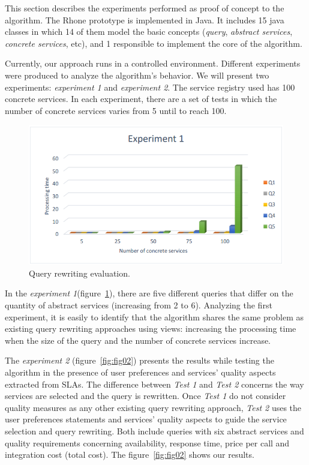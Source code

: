 This section describes the experiments performed as proof of concept to the algorithm.
The Rhone prototype is implemented in Java.
It includes 15 java classes in which 14 of them model the basic concepts 
(\textit{query}, \textit{abstract services}, \textit{concrete services}, etc), 
and 1 responsible to implement the core of the algorithm. 

Currently, our approach runs in a controlled environment. 
Different experiments were produced to analyze the algorithm's behavior.
We will present two experiments: \textit{experiment 1} and \textit{experiment 2}.
The service registry used has 100 concrete services. 
In each experiment, there are a set of tests in which the number of concrete 
services varies from 5 until to reach 100.

\begin{figure}[!h]
\centering
\includegraphics[scale=0.4]{exp1.png}
\caption{Query rewriting evaluation.}\label{fig01}
\end{figure} 

In the \textit{experiment 1}(figure~\ref{fig01}), there are five different queries that differ on
the quantity of abstract services (increasing from 2 to 6). Analyzing the first
experiment, it is easily to identify that the algorithm shares the same problem
as existing query rewriting approaches using views: increasing the
processing time when the size of the query and the number of concrete services increase.


The \textit{experiment 2} (figure~\ref{fig:fig02}) presents the results while testing the algorithm in the presence of user preferences and services' quality aspects extracted from SLAs.  The difference between \textit{Test 1} and \textit{Test 2} concerns the way services are selected and the query is rewritten. Once \textit{Test 1} do not consider quality measures as any other existing query rewriting approach, \textit{Test 2} uses the user preferences statements and services' quality aspects to guide the service selection and query rewriting.
Both include queries with six abstract services and quality requirements concerning availability, response time, price per call and integration cost (total cost). The figure~\ref{fig:fig02} shows our results. 

